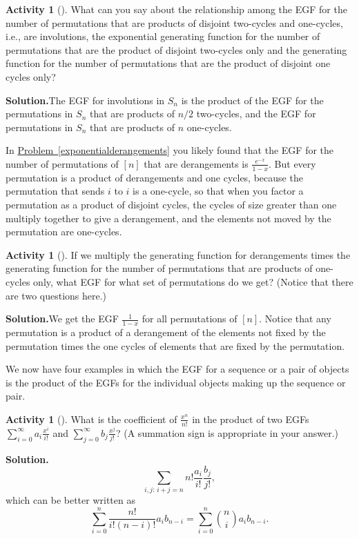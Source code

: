 \documentclass[10pt,]{book}
\theoremstyle{plain}
\theoremstyle{definition}
\newtheorem{activity}[project]{Activity}
\numberwithin{equation}{chapter}
\begin{document}
\begin{activity}[]\label{x2cyclesand1cycles}
What can you say about the relationship among the EGF for the number of permutations that are products of disjoint two-cycles and one-cycles, i.e., are involutions, the exponential generating function for the number of permutations that are the product of disjoint two-cycles only and the generating function for the number of permutations that are the product of disjoint one cycles only?%
\par\medskip\noindent%
\textbf{Solution.}\quad The EGF for involutions in \(S_n\) is the product of the EGF for the permutations in \(S_n\) that are products of \(n/2\) two-cycles, and the EGF for permutations in \(S_n\) that are products of \(n\) one-cycles.%
\end{activity}
In \hyperref[exponentialderangements]{Problem~\ref{exponentialderangements}} you likely found that the EGF for the number of permutations of \([n]\) that are derangements is \(\frac{e^{-x}}{1-x}\). But every permutation is a product of derangements and one cycles, because the permutation that sends \(i\) to \(i\) is a one-cycle, so that when you factor a permutation as a product of disjoint cycles, the cycles of size greater than one multiply together to give a derangement, and the elements not moved by the permutation are one-cycles.%
\begin{activity}[]\label{derangementsand1cycles}
If we multiply the generating function for derangements times the generating function for the number of permutations that are products of one-cycles only, what EGF for what set of permutations do we get? (Notice that there are two questions here.)%
\par\medskip\noindent%
\textbf{Solution.}\quad We get the EGF \(\frac{1}{ 1-x}\) for all permutations of \([n]\). Notice that any permutation is a product of a derangement of the elements not fixed by the permutation times the one cycles of elements that are fixed by the permutation.%
\end{activity}
We now have four examples in which the EGF for a sequence or a pair of objects is the product of the EGFs for the individual objects making up the sequence or pair.%
\begin{activity}[]\label{exponentialpp1}
What is the coefficient of \(\frac{x^n}{n!}\) in the product of two EGFs \(\sum_{i=0}^\infty a_i\frac{x^i}{i!}\) and \(\sum_{j=0}^\infty
b_j\frac{x^j}{j!}\)? (A summation sign is appropriate in your answer.)%
\par\medskip\noindent%
\textbf{Solution.}\quad %
\begin{equation*}
\sum_{i,j\mbox{:\ }
i+j=n} n!\frac{a_i}{i!}\frac{b_j }{j!},
\end{equation*}
which can be better written as%
\begin{equation*}
\sum_{i=0}^n\frac{n!}{i!(n-i)!} a_i
b_{n-i}=\sum_{i=0}^n\binom{n}{i} a_i b_{n-i}.
\end{equation*}
%
\end{activity}
\end{document}
